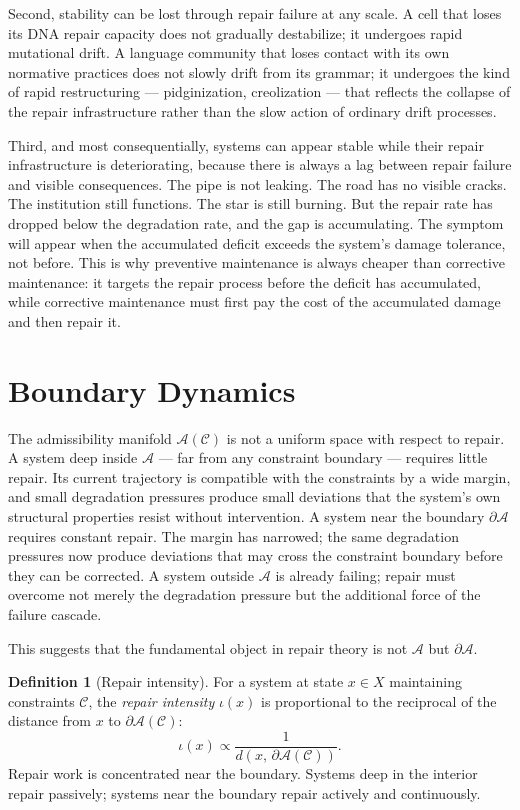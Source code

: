 \documentclass[11pt, a4paper]{article}
\theoremstyle{definition}
\newtheorem{definition}{Definition}
\theoremstyle{remark}
\begin{document}
Second, stability can be lost through repair failure at any scale. A cell that
loses its DNA repair capacity does not gradually destabilize; it undergoes rapid
mutational drift. A language community that loses contact with its own normative
practices does not slowly drift from its grammar; it undergoes the kind of rapid
restructuring --- pidginization, creolization --- that reflects the collapse of
the repair infrastructure rather than the slow action of ordinary drift processes.

Third, and most consequentially, systems can appear stable while their repair
infrastructure is deteriorating, because there is always a lag between repair
failure and visible consequences. The pipe is not leaking. The road has no
visible cracks. The institution still functions. The star is still burning. But
the repair rate has dropped below the degradation rate, and the gap is
accumulating. The symptom will appear when the accumulated deficit exceeds the
system's damage tolerance, not before. This is why preventive maintenance is
always cheaper than corrective maintenance: it targets the repair process before
the deficit has accumulated, while corrective maintenance must first pay the
cost of the accumulated damage and then repair it.

\section{Boundary Dynamics}

The admissibility manifold $\mathcal{A}(\mathcal{C})$ is not a uniform space
with respect to repair. A system deep inside $\mathcal{A}$ --- far from any
constraint boundary --- requires little repair. Its current trajectory is
compatible with the constraints by a wide margin, and small degradation
pressures produce small deviations that the system's own structural properties
resist without intervention. A system near the boundary $\partial\mathcal{A}$
requires constant repair. The margin has narrowed; the same degradation
pressures now produce deviations that may cross the constraint boundary before
they can be corrected. A system outside $\mathcal{A}$ is already failing; repair
must overcome not merely the degradation pressure but the additional force of
the failure cascade.

This suggests that the fundamental object in repair theory is not $\mathcal{A}$
but $\partial\mathcal{A}$.

\begin{definition}[Repair intensity]
For a system at state $x \in X$ maintaining constraints $\mathcal{C}$, the
\textit{repair intensity} $\iota(x)$ is proportional to the reciprocal of the
distance from $x$ to $\partial\mathcal{A}(\mathcal{C})$:
\[
\iota(x) \propto \frac{1}{d(x,\, \partial\mathcal{A}(\mathcal{C}))}.
\]
Repair work is concentrated near the boundary. Systems deep in the interior
repair passively; systems near the boundary repair actively and continuously.
\end{definition}
\end{document}
